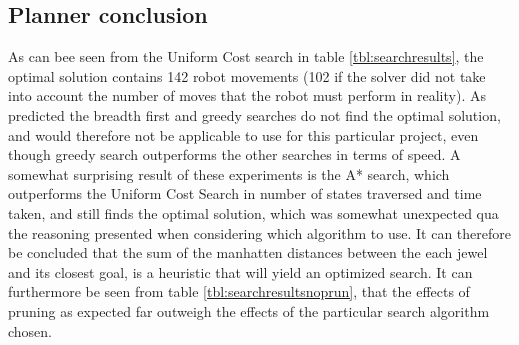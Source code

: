 \subsection{Planner conclusion}
As can bee seen from the Uniform Cost search in table \ref{tbl:searchresults}, the optimal solution contains 142 robot movements (102 if the solver did not take into account the number of moves that the robot must perform in reality). As predicted the breadth first and greedy searches do not find the optimal solution, and would therefore not be applicable to use for this particular project, even though greedy search outperforms the other searches in terms of speed. A somewhat surprising result of these experiments is the A* search, which outperforms the Uniform Cost Search in number of states traversed and time taken, and still finds the optimal solution, which was somewhat unexpected qua the reasoning presented when considering which algorithm to use. It can therefore be concluded that the sum of the manhatten distances between the each jewel and its closest goal, is a heuristic that will yield an optimized search. It can furthermore be seen from table \ref{tbl:searchresultsnoprun}, that the effects of pruning as expected far outweigh the effects of the particular search algorithm chosen.
